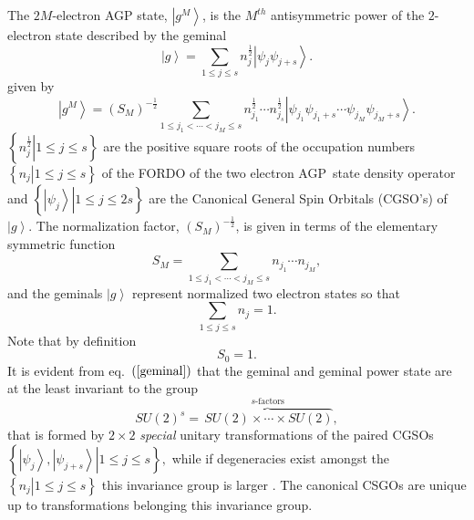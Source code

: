 \documentclass[aps,preprint]{revtex4}%
\begin{document}
The $2M$-electron AGP state, $\left\vert g^{M}\right\rangle $, is the $M^{th}$
antisymmetric power of the $2$-electron state described by the geminal
\begin{equation}
\left\vert g\right\rangle =\sum_{1\leq j\leq s}n_{j}^{\frac{1}{2}}\left\vert
\psi_{j}\psi_{j+s}\right\rangle . \label{geminal}%
\end{equation}
given by
\begin{equation}
\left\vert g^{M}\right\rangle =\left(  S_{M}\right)  ^{-\frac{1}{2}}%
\sum_{1\leq j_{1}<\cdots<j_{M}\leq s}n_{j_{1}}^{\frac{1}{2}}\cdots n_{j_{s}%
}^{\frac{1}{2}}\left\vert \psi_{j_{1}}\psi_{j_{1}+s}\cdots\psi_{j_{M}}%
\psi_{j_{M}+s}\right\rangle . \label{agp}%
\end{equation}
$\left\{  \left.  n_{j}^{\frac{1}{2}}\right\vert 1\leq j\leq s\right\}  $ are
the positive square roots of the occupation numbers $\left\{  \left.
n_{j}\right\vert 1\leq j\leq s\right\}  $ of the FORDO of the two electron
AGP\ state density operator and $\left\{  \left.  \left\vert \psi
_{j}\right\rangle \right\vert 1\leq j\leq2s\right\}  $ are the Canonical
General Spin Orbitals (CGSO's) of $\left\vert g\right\rangle .$ The
normalization factor, $\left(  S_{M}\right)  ^{-\frac{1}{2}}$, is given in
terms of the elementary symmetric function
\begin{equation}
S_{M}=\sum_{1\leq j_{1}<\cdots<j_{M}\leq s}n_{j_{1}}\cdots n_{j_{M}},
\end{equation}
and the geminals $\left\vert g\right\rangle $ represent normalized two
electron states so that
\begin{equation}
\sum_{1\leq j\leq s}n_{j}=1.
\end{equation}
Note that by definition
\begin{equation}
S_{0}=1.
\end{equation}
It is evident from eq.\ $\left(  \ref{geminal}\right)  $ that the geminal and
geminal power state are at the least invariant to the group
\begin{equation}
SU\left(  2\right)  ^{s}=\overset{s\text{-factors}}{\overbrace{\,SU\left(
2\right)  \times\cdots\times SU\left(  2\right)  }},
\end{equation}
that is formed by $2\times2$ \emph{special} unitary transformations of the
paired CGSOs $\left\{  \left.  \left\vert \psi_{j}\right\rangle ,\left\vert
\psi_{j+s}\right\rangle \right\vert 1\leq j\leq s\right\}  ,$ while if
degeneracies exist amongst the $\left\{  \left.  n_{j}\right\vert 1\leq j\leq
s\right\}  $ this invariance group is larger \cite{AGPCoherent}. The canonical
CSGOs are unique up to transformations belonging this invariance group.
\end{document}
